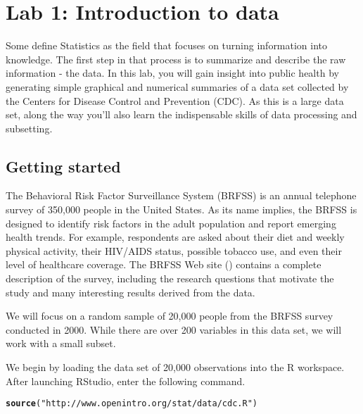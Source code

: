 \documentclass{article}\usepackage[]{graphicx}\usepackage[]{color}
\makeatletter
\newcommand{\hlstr}[1]{\textcolor[rgb]{0.192,0.494,0.8}{#1}}%
\newcommand{\hlstd}[1]{\textcolor[rgb]{0.345,0.345,0.345}{#1}}%
\newcommand{\hlkwd}[1]{\textcolor[rgb]{0.737,0.353,0.396}{\textbf{#1}}}%
\newenvironment{kframe}{%
 \def\at@end@of@kframe{}%
 \ifinner\ifhmode%
  \def\at@end@of@kframe{\end{minipage}}%
  \begin{minipage}{\columnwidth}%
 \fi\fi%
 \def\FrameCommand##1{\hskip\@totalleftmargin \hskip-\fboxsep
 \colorbox{shadecolor}{##1}\hskip-\fboxsep
     \hskip-\linewidth \hskip-\@totalleftmargin \hskip\columnwidth}%
 \MakeFramed {\advance\hsize-\width
   \@totalleftmargin\z@ \linewidth\hsize
   \@setminipage}}%
 {\par\unskip\endMakeFramed%
 \at@end@of@kframe}
\newenvironment{knitrout}{}{} %
\makeatother
\begin{document}

\section*{Lab 1: Introduction to data}

Some define Statistics as the field that focuses on turning information into knowledge.  The first step in that process is to summarize and describe the raw information - the data.  In this lab, you will gain insight into public health by generating simple graphical and numerical summaries of a data set collected by the Centers for Disease Control and Prevention (CDC).  As this is a large data set, along the way you'll also learn the indispensable skills of data processing and subsetting.

\subsection*{Getting started}
The Behavioral Risk Factor Surveillance System (BRFSS) is an annual telephone survey of 350,000 people in the United States. As its name implies, the BRFSS is designed to identify risk factors in the adult population and report emerging health trends. For example, respondents are asked about their diet and weekly physical activity, their HIV/AIDS status, possible tobacco use, and even their level of healthcare coverage. The BRFSS Web site () contains a complete description of the survey, including the research questions that motivate the study and many interesting results derived from the data.

We will focus on a random sample of 20,000 people from the BRFSS survey conducted in 2000. While there are over 200  variables in this data set, we will work with a small subset.

We begin by loading the data set of 20,000 observations into the R workspace. After launching RStudio, enter the following command.

\begin{knitrout}
\color{fgcolor}\begin{kframe}
\begin{alltt}
\hlkwd{source}\hlstd{(}\hlstr{"http://www.openintro.org/stat/data/cdc.R"}\hlstd{)}
\end{alltt}
\end{kframe}
\end{knitrout}
\end{document}
